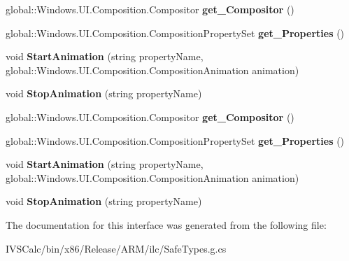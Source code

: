 \begin{DoxyCompactItemize}
\item 
\mbox{\label{interface_windows_1_1_u_i_1_1_composition_1_1_i_composition_object_a61c8be4943d7e05e28090025b57637b8}} 
global\+::\+Windows.\+U\+I.\+Composition.\+Compositor {\bfseries get\+\_\+\+Compositor} ()
\item 
\mbox{\label{interface_windows_1_1_u_i_1_1_composition_1_1_i_composition_object_a8b4cd5d3437e00c9e5b1e2533c068496}} 
global\+::\+Windows.\+U\+I.\+Composition.\+Composition\+Property\+Set {\bfseries get\+\_\+\+Properties} ()
\item 
\mbox{\label{interface_windows_1_1_u_i_1_1_composition_1_1_i_composition_object_a088c63d6d52d35264dd7c45af14b2c2b}} 
void {\bfseries Start\+Animation} (string property\+Name, global\+::\+Windows.\+U\+I.\+Composition.\+Composition\+Animation animation)
\item 
\mbox{\label{interface_windows_1_1_u_i_1_1_composition_1_1_i_composition_object_a3e0870776b613990ed3b7aeb31408e88}} 
void {\bfseries Stop\+Animation} (string property\+Name)
\item 
\mbox{\label{interface_windows_1_1_u_i_1_1_composition_1_1_i_composition_object_a61c8be4943d7e05e28090025b57637b8}} 
global\+::\+Windows.\+U\+I.\+Composition.\+Compositor {\bfseries get\+\_\+\+Compositor} ()
\item 
\mbox{\label{interface_windows_1_1_u_i_1_1_composition_1_1_i_composition_object_a8b4cd5d3437e00c9e5b1e2533c068496}} 
global\+::\+Windows.\+U\+I.\+Composition.\+Composition\+Property\+Set {\bfseries get\+\_\+\+Properties} ()
\item 
\mbox{\label{interface_windows_1_1_u_i_1_1_composition_1_1_i_composition_object_a088c63d6d52d35264dd7c45af14b2c2b}} 
void {\bfseries Start\+Animation} (string property\+Name, global\+::\+Windows.\+U\+I.\+Composition.\+Composition\+Animation animation)
\item 
\mbox{\label{interface_windows_1_1_u_i_1_1_composition_1_1_i_composition_object_a3e0870776b613990ed3b7aeb31408e88}} 
void {\bfseries Stop\+Animation} (string property\+Name)
\end{DoxyCompactItemize}


The documentation for this interface was generated from the following file\+:\begin{DoxyCompactItemize}
\item 
I\+V\+S\+Calc/bin/x86/\+Release/\+A\+R\+M/ilc/Safe\+Types.\+g.\+cs\end{DoxyCompactItemize}
